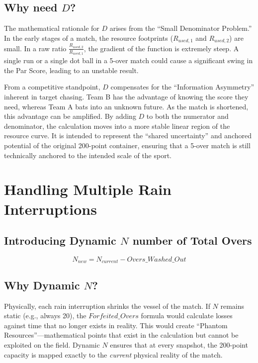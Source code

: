 \documentclass[12pt, letterpaper, fleqn]{article}
\begin{document}
\subsection{Why need $D$?}

\indent The mathematical rationale for $D$ arises from the ``Small Denominator Problem.'' In the early stages of a match, the resource footprints ($R_{used,1}$ and $R_{used,2}$) are small. In a raw ratio $\frac{R_{used,2}}{R_{used,1}}$, the gradient of the function is extremely steep. A single run or a single dot ball in a 5-over match could cause a significant swing in the Par Score, leading to an unstable result.

\indent From a competitive standpoint, $D$ compensates for the ``Information Asymmetry'' inherent in target chasing. Team B has the advantage of knowing the score they need, whereas Team A bats into an unknown future. As the match is shortened, this advantage can be amplified. By adding $D$ to both the numerator and denominator, the calculation moves into a more stable linear region of the resource curve. It is intended to represent the ``shared uncertainty'' and anchored potential of the original 200-point container, ensuring that a 5-over match is still technically anchored to the intended scale of the sport.

\section{Handling Multiple Rain Interruptions}

\subsection{Introducing Dynamic $N$ number of Total Overs}
\begin{equation}
N_{new} = N_{current} - Overs\_Washed\_Out
\end{equation}

\subsection{Why Dynamic $N$?}
\indent Physically, each rain interruption shrinks the vessel of the match. If $N$ remains static (e.g., always 20), the $Forfeited\_Overs$ formula would calculate losses against time that no longer exists in reality. This would create ``Phantom Resources''---mathematical points that exist in the calculation but cannot be exploited on the field. Dynamic $N$ ensures that at every snapshot, the 200-point capacity is mapped exactly to the \textit{current} physical reality of the match.
\end{document}
